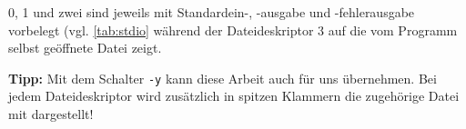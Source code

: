 0, 1 und zwei sind jeweils mit Standardein-, -ausgabe und -fehlerausgabe vorbelegt (vgl.
\autoref{tab:stdio} während der Dateideskriptor 3 auf die vom Programm selbst geöffnete Datei zeigt.

\textbf{Tipp:} Mit dem Schalter \texttt{-y} kann diese Arbeit auch \strace{} für uns übernehmen.
Bei jedem Dateideskriptor wird zusätzlich in spitzen Klammern die zugehörige Datei mit dargestellt!